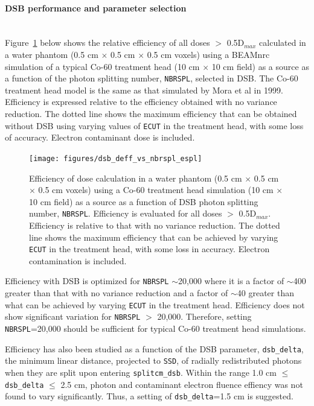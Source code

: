 \documentclass[12pt,twoside]{article}
\begin{document}
\paragraph{DSB performance and parameter selection}\mbox{}\\

Figure~\ref{dsb_deff_fig} below shows the relative efficiency of all doses $>$ 0.5D$_{max}$ calculated in
a water phantom (0.5 cm $\times$ 0.5 cm $\times$ 0.5 cm voxels)  using a BEAMnrc simulation of a
typical Co-60
treatment head (10 cm $\times$ 10 cm field) as a source as a function of the photon
splitting number, {\tt NBRSPL}, selected in DSB.  The Co-60 treatment head model is the same as that
simulated by Mora et al\cite{Mo99} in 1999.  Efficiency is expressed relative
to the efficiency obtained with no variance reduction.  The dotted line shows the maximum efficiency
that can be obtained without DSB using varying values of {\tt ECUT} in the treatment head, with some loss of
accuracy.  Electron contaminant dose is included.

\begin{figure}[htbp]
\begin{center}
\texttt{[image: figures/dsb\_deff\_vs\_nbrspl\_espl]}
\end{center}
\caption[Performance of DSB]
{Efficiency of dose calculation in a water phantom (0.5 cm $\times$ 0.5 cm $\times$ 0.5 cm voxels) using
a Co-60 treatment head simulation (10 cm $\times$ 10 cm field) as a source as a
function of DSB photon splitting number, {\tt NBRSPL}.  Efficiency is evaluated for all doses $>$ 0.5D$_{max}$.
Efficiency is relative to that with no variance reduction.  The dotted line shows the maximum efficiency
that can be achieved by varying {\tt ECUT} in the treatment head, with some loss in accuracy.  Electron
contamination is included.}
\label{dsb_deff_fig}
\end{figure}

Efficiency with DSB is optimized for {\tt NBRSPL} $\sim$20,000 where it is a factor of $\sim$400 greater than that
with no variance reduction and a factor of $\sim$40 greater than what can be achieved by varying {\tt ECUT}
in the treatment head.  Efficiency does not show significant variation for {\tt NBRSPL} $>$ 20,000.  Therefore,
setting {\tt NBRSPL}=20,000 should be sufficient for typical Co-60 treatment head simulations.

Efficiency has also been studied as a function of the DSB parameter, {\tt dsb\_delta}, the minimum linear
distance, projected to {\tt SSD}, of radially redistributed photons when they are split upon entering {\tt splitcm\_dsb}.  Within the range 1.0 cm $\leq$ {\tt dsb\_delta} $\leq$ 2.5 cm, photon and contaminant electron fluence effiency
was not found to vary significantly.  Thus, a setting of {\tt dsb\_delta}=1.5 cm is suggested.
\end{document}
